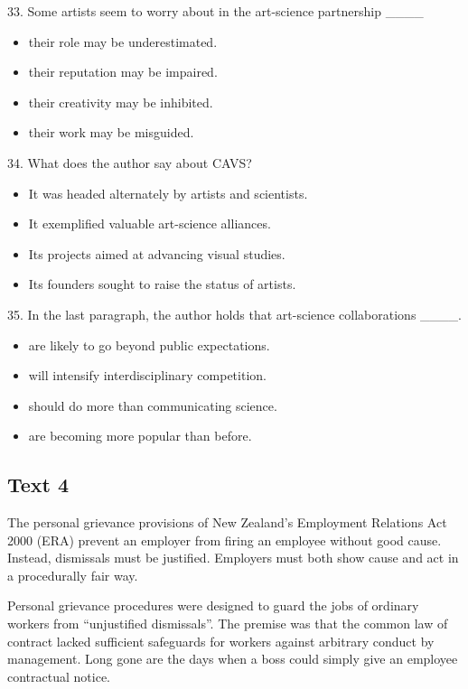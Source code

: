\documentclass[UTF8,11pt]{ctexart}
\begin{document}
33. Some artists seem to worry about in the art-science partnership \_\_\_\_


\begin{itemize}[leftmargin=2em,itemsep=.2em,topsep=.4em]\item[A.] their role may be underestimated.
\item[B.] their reputation may be impaired.
\item[C.] their creativity may be inhibited.
\item[D.] their work may be misguided.
\end{itemize}

34. What does the author say about CAVS?


\begin{itemize}[leftmargin=2em,itemsep=.2em,topsep=.4em]\item[A.] It was headed alternately by artists and scientists.
\item[B.] It exemplified valuable art-science alliances.
\item[C.] Its projects aimed at advancing visual studies.
\item[D.] Its founders sought to raise the status of artists.
\end{itemize}

35. In the last paragraph, the author holds that art-science collaborations \_\_\_\_.


\begin{itemize}[leftmargin=2em,itemsep=.2em,topsep=.4em]\item[A.] are likely to go beyond public expectations.
\item[B.] will intensify interdisciplinary competition.
\item[C.] should do more than communicating science.
\item[D.] are becoming more popular than before.
\end{itemize}

\subsection*{\textbf{Text 4}}


The personal grievance provisions of New Zealand’s Employment Relations Act 2000 (ERA) prevent an employer from firing an employee without good cause. Instead, dismissals must be justified. Employers must both show cause and act in a procedurally fair way.


Personal grievance procedures were designed to guard the jobs of ordinary workers from “unjustified dismissals”. The premise was that the common law of contract lacked sufficient safeguards for workers against arbitrary conduct by management. Long gone are the days when a boss could simply give an employee contractual notice.
\end{document}
